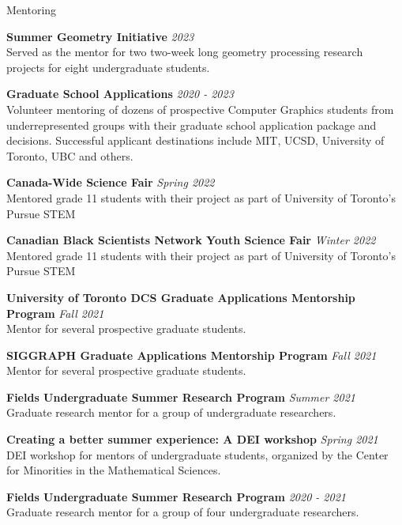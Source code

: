 \documentclass{resume}
\newcommand{\cvitem}[3]{
    {\bf #1} \hfill {\em \small #2} \\ 
    {\small#3 }
}
\begin{document}
\begin{rSection}{Mentoring}

\cvitem{Summer Geometry Initiative}{2023}{Served as the mentor for two two-week long geometry processing research projects for eight undergraduate students.}

\cvitem{Graduate School Applications}{2020 - 2023}{Volunteer mentoring of dozens of prospective Computer Graphics students from underrepresented groups with their graduate school application package and decisions. Successful applicant destinations include MIT, UCSD, University of Toronto, UBC and others.}

\cvitem{Canada-Wide Science Fair}{Spring 2022}{Mentored grade 11 students with their project as part of University of Toronto's Pursue STEM}

\cvitem{Canadian Black Scientists Network Youth Science Fair}{Winter 2022}{Mentored grade 11 students with their project as part of University of Toronto's Pursue STEM}

\cvitem{University of Toronto DCS Graduate Applications Mentorship Program}{Fall 2021}{Mentor for several prospective graduate students.}

\cvitem{SIGGRAPH Graduate Applications Mentorship Program}{Fall 2021}{Mentor for several prospective graduate students.}

\cvitem{Fields Undergraduate Summer Research Program}{Summer 2021}{Graduate research mentor for a group of undergraduate researchers.}

\cvitem{Creating a better summer experience: A DEI workshop}{Spring 2021}{DEI workshop for mentors of undergraduate students, organized by the Center for Minorities in the Mathematical Sciences.}

\cvitem{Fields Undergraduate Summer Research Program}{2020 - 2021}{Graduate research mentor for a group of four undergraduate researchers.}

\end{rSection}
\end{document}
